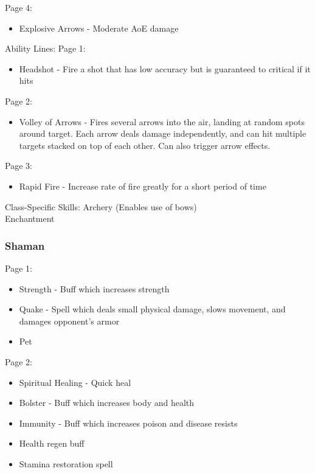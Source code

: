 \documentclass{article}
\begin{document}
Page 4:
\begin{itemize}
    \item Explosive Arrows - Moderate AoE damage
\end{itemize}

Ability Lines:
Page 1:
\begin{itemize}
    \item Headshot - Fire a shot that has low accuracy but is guaranteed to critical if it hits
    
\end{itemize}

Page 2:
\begin{itemize}
    \item Volley of Arrows - Fires several arrows into the air, landing at random spots around target.
        Each arrow deals damage independently, and can hit multiple targets stacked on top of each
        other. Can also trigger arrow effects.
    
\end{itemize}

Page 3:
\begin{itemize}
    \item Rapid Fire - Increase rate of fire greatly for a short period of time
    
\end{itemize}

Class-Specific Skills:
Archery (Enables use of bows)\\
Enchantment\\


\subsubsection{Shaman}
Page 1:
\begin{itemize}
    \item Strength - Buff which increases strength
    \item Quake - Spell which deals small physical damage, slows movement, and damages opponent's armor
    \item Pet
    
\end{itemize}

Page 2:
\begin{itemize}
    \item Spiritual Healing - Quick heal
    \item Bolster - Buff which increases body and health
    \item Immunity - Buff which increases poison and disease resists
    \item Health regen buff
    \item Stamina restoration spell
    
\end{itemize}
\end{document}
